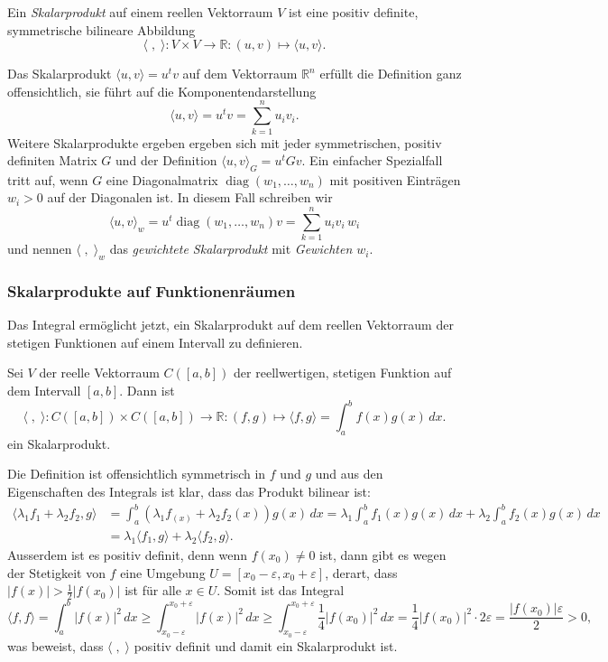 \begin{definition}
Ein {\em Skalarprodukt} auf einem reellen Vektorraum $V$ ist eine
positiv definite, symmetrische bilineare Abbildung
\[
\langle\;,\;\rangle
\colon
V\times V
\to
\mathbb{R}
:
(u,v) \mapsto \langle u,v\rangle.
\]
\end{definition}

Das Skalarprodukt $\langle u,v\rangle=u^tv$ auf dem Vektorraum 
$\mathbb{R}^n$ erfüllt die Definition ganz offensichtlich,
sie führt auf die Komponentendarstellung
\[
\langle u,v\rangle = u^tv = \sum_{k=1}^n u_iv_i.
\]
Weitere Skalarprodukte ergeben ergeben sich mit jeder symmetrischen,
positiv definiten Matrix $G$ und der Definition
$\langle u,v\rangle_G=u^tGv$.
Ein einfacher Spezialfall tritt auf, wenn $G$ eine Diagonalmatrix
$\operatorname{diag}(w_1,\dots,w_n)$
mit positiven Einträgen $w_i>0$ auf der Diagonalen ist.
In diesem Fall schreiben wir
\[
\langle u,v\rangle_w
=
u^t\operatorname{diag}(w_1,\dots,w_n)v
=
\sum_{k=1}^n u_iv_i\,w_i
\]
und nennen $\langle \;,\;\rangle_w$ das {\em gewichtete Skalarprodukt}
mit {\em Gewichten $w_i$}.

\subsubsection{Skalarprodukte auf Funktionenräumen}
Das Integral ermöglicht jetzt, ein Skalarprodukt auf dem reellen
Vektorraum der stetigen Funktionen auf einem Intervall zu definieren.

\begin{definition}
Sei $V$ der reelle Vektorraum $C([a,b])$ der reellwertigen, stetigen
Funktion auf dem Intervall $[a,b]$.
Dann ist 
\[
\langle\;,\;\rangle
\colon
C([a,b]) \times C([a,b]) \to \mathbb{R}
:
(f,g) \mapsto \langle f,g\rangle = \int_a^b f(x)g(x)\,dx.
\]
ein Skalarprodukt.
\end{definition}

Die Definition ist offensichtlich symmetrisch in $f$ und $g$ und
aus den Eigenschaften des Integrals ist klar, dass das Produkt
bilinear ist:
\begin{align*}
\langle \lambda_1 f_1+\lambda_2f_2,g\rangle
&=
\int_a^b (\lambda_1f_(x) +\lambda_2f_2(x))g(x)\,dx
=
\lambda_1\int_a^b f_1(x) g(x)\,dx
+
\lambda_2\int_a^b f_2(x) g(x)\,dx
\\
&=
\lambda_1\langle f_1,g\rangle
+
\lambda_2\langle f_2,g\rangle.
\end{align*}
Ausserdem ist es positiv definit, denn wenn $f(x_0) \ne 0$ ist,
dann gibt es wegen der Stetigkeit von $f$ eine Umgebung
$U=[x_0-\varepsilon,x_0+\varepsilon]$, derart, dass $|f(x)| > \frac12|f(x_0)|$
ist für alle $x\in U$.
Somit ist das Integral
\[
\langle f,f\rangle
=
\int_a^b |f(x)|^2\,dx
\ge
\int_{x_0-\varepsilon}^{x_0+\varepsilon} |f(x)|^2\,dx
\ge
\int_{x_0-\varepsilon}^{x_0+\varepsilon} \frac14|f(x_0)|^2\,dx
=
\frac{1}{4}|f(x_0)|^2\cdot 2\varepsilon
=
\frac{|f(x_0)|\varepsilon}{2}
>0,
\]
was beweist, dass $\langle\;,\;\rangle$ positiv definit und damit
ein Skalarprodukt ist.


